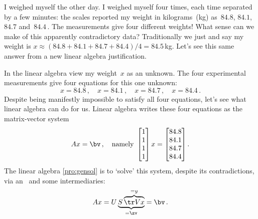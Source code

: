 \begin{example} \label{eg:fourwts}
I weighed myself the other day. 
I weighed myself four times, each time separated by a few minutes:  the scales reported my weight in kilograms~(kg) as~\(84.8\), \(84.1\), \(84.7\) and~\(84.4\)\,.
The measurements give four different weights!
What sense can we make of this apparently contradictory data?
Traditionally we just  and say my weight is \(x\approx (84.8+84.1+84.7+84.4)/4=84.5\)\,kg.
Let's see this same answer from a new linear algebra justification.

In the linear algebra view my weight~\(x\) as an unknown.
The four experimental measurements give four equations for this one unknown:
\begin{equation*}
x=84.8\,,\quad
x=84.1\,,\quad
x=84.7\,,\quad
x=84.4\,.
\end{equation*}
Despite being manifestly impossible to satisfy all four equations, let's see what linear algebra can do for us.
Linear algebra writes these four equations as the matrix-vector system
\begin{equation*}
Ax=\bv\,,\quad\text{namely }
\begin{bmatrix} 1\\1\\1\\1 \end{bmatrix}x
=\begin{bmatrix} 84.8\\84.1\\84.7\\84.4 \end{bmatrix}.
\end{equation*}
The linear algebra \cref{pro:gensol} is to `solve' this system, despite its contradictions, via an \svd\ and some intermediaries:
\begin{equation*}
Ax=U\underbrace{S\overbrace{\tr Vx}^{=y}}_{=\zv}=\bv\,.
\end{equation*}


\end{example}
